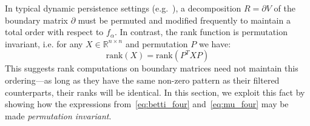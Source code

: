 \documentclass[10pt]{article}
\numberwithin{equation}{section}
\newcommand{\+}{%
	\raisebox{0.18ex}{\scaleobj{0.55}{+}}
}
\theoremstyle{definition}
\theoremstyle{definition}
\begin{document}
In typical dynamic persistence settings (e.g.~\cite{cohen2006vines}), a decomposition $R = \partial V$ of the boundary matrix $\partial$ must be permuted and modified frequently to maintain a total order with respect to $f_\alpha$.  %
In contrast, the rank function is permutation invariant, i.e. for any $X \in \mathbb{R}^{n \times n}$ and permutation $P$ we have: 
$$ \mathrm{rank}(X) = \mathrm{rank}(P^T X  P) $$
This suggests rank computations on boundary matrices need not maintain this ordering---as long as they have the same non-zero pattern as their filtered counterparts, their ranks will be identical.
In this section, we exploit this fact by showing how the expressions from~\eqref{eq:betti_four} and~\eqref{eq:mu_four} may be made \emph{permutation invariant}.
\end{document}
